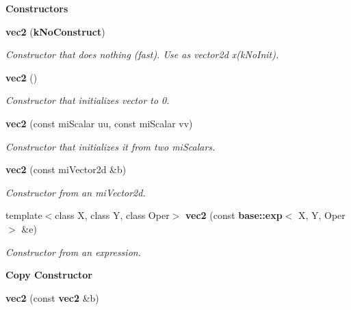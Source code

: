\begin{Indent}{\bf Constructors}\par
\begin{CompactItemize}
\item 
{\bf vec2} ({\bf k\-No\-Construct})
\begin{CompactList}\small\item\em Constructor that does nothing (fast). Use as vector2d x(k\-No\-Init). \item\end{CompactList}\item 
{\bf vec2} ()
\begin{CompactList}\small\item\em Constructor that initializes vector to 0. \item\end{CompactList}\item 
{\bf vec2} (const mi\-Scalar uu, const mi\-Scalar vv)
\begin{CompactList}\small\item\em Constructor that initializes it from two mi\-Scalars. \item\end{CompactList}\item 
{\bf vec2} (const mi\-Vector2d \&b)
\begin{CompactList}\small\item\em Constructor from an mi\-Vector2d. \item\end{CompactList}\item 
template$<$class X, class Y, class Oper$>$ {\bf vec2} (const {\bf base::exp}$<$ X, Y, Oper $>$ \&e)
\begin{CompactList}\small\item\em Constructor from an expression. \item\end{CompactList}\end{CompactItemize}
\end{Indent}
\begin{Indent}{\bf Copy Constructor}\par
\begin{CompactItemize}
\item 
{\bf vec2} (const {\bf vec2} \&b)
\end{CompactItemize}
\end{Indent}
